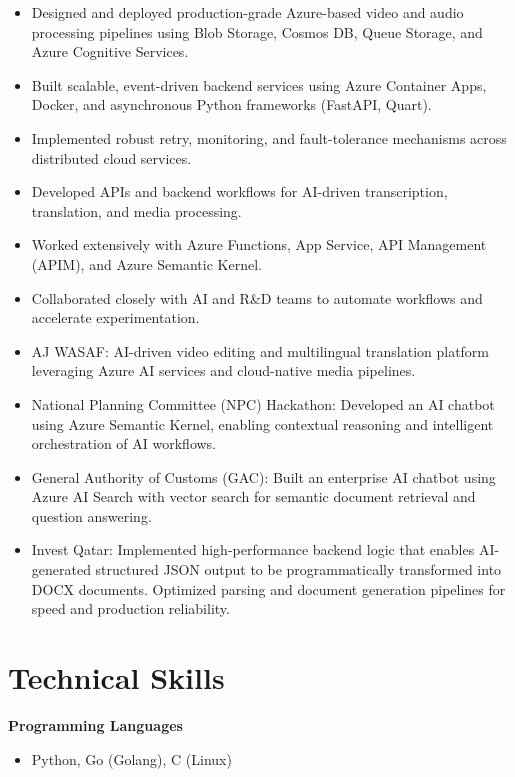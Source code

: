 \documentclass[11pt,a4paper]{article}
\begin{document}
\begin{itemize}[leftmargin=*]
    \item Designed and deployed production-grade Azure-based video and audio processing pipelines using Blob Storage, Cosmos DB, Queue Storage, and Azure Cognitive Services.
    \item Built scalable, event-driven backend services using Azure Container Apps, Docker, and asynchronous Python frameworks (FastAPI, Quart).
    \item Implemented robust retry, monitoring, and fault-tolerance mechanisms across distributed cloud services.
    \item Developed APIs and backend workflows for AI-driven transcription, translation, and media processing.
    \item Worked extensively with Azure Functions, App Service, API Management (APIM), and Azure Semantic Kernel.
    \item Collaborated closely with AI and R\&D teams to automate workflows and accelerate experimentation.

    \item AJ WASAF: AI-driven video editing and multilingual translation platform leveraging Azure AI services and cloud-native media pipelines.

    \item National Planning Committee (NPC) Hackathon: Developed an AI chatbot using Azure Semantic Kernel, enabling contextual reasoning and intelligent orchestration of AI workflows.

    \item General Authority of Customs (GAC): Built an enterprise AI chatbot using Azure AI Search with vector search for semantic document retrieval and question answering.

    \item Invest Qatar: Implemented high-performance backend logic that enables AI-generated structured JSON output to be programmatically transformed into DOCX documents. Optimized parsing and document generation pipelines for speed and production reliability.
\end{itemize}

\section*{Technical Skills}

\textbf{Programming Languages}
\begin{itemize}[leftmargin=*]
    \item Python, Go (Golang), C (Linux)
\end{itemize}
\end{document}
